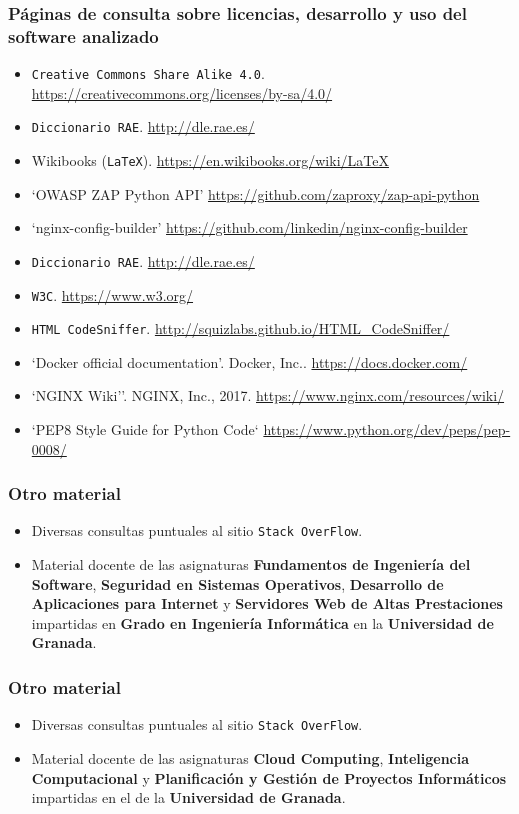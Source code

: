 
\printbibliography[heading=bibempty]

\bigskip
\subsubsection*{Páginas de consulta sobre licencias, desarrollo y uso del software analizado}
\begin{itemize}
	\item {\tt Creative Commons Share Alike 4.0}. \url{https://creativecommons.org/licenses/by-sa/4.0/}
	\item {\tt Diccionario RAE}. \url{http://dle.rae.es/}
	\item Wikibooks ({\tt LaTeX}). \url{https://en.wikibooks.org/wiki/LaTeX}
	\item `OWASP ZAP Python API' \url{https://github.com/zaproxy/zap-api-python}
	\item `nginx-config-builder' \url{https://github.com/linkedin/nginx-config-builder}
	\item {\tt Diccionario RAE}. \url{http://dle.rae.es/}
	\item {\tt W3C}. \url{https://www.w3.org/}
	\item {\tt HTML CodeSniffer}. \url{http://squizlabs.github.io/HTML_CodeSniffer/}
	\item `Docker official documentation'. Docker, Inc.. \url{https://docs.docker.com/}
	\item `NGINX Wiki''. NGINX, Inc., 2017. \url{https://www.nginx.com/resources/wiki/}
	\item `PEP8 Style Guide for Python Code` \url{https://www.python.org/dev/peps/pep-0008/}
\end{itemize}
\bigskip
\subsubsection*{Otro material}
\begin{itemize}
	\item Diversas consultas puntuales al sitio {\tt Stack OverFlow}.
	\item Material docente de las asignaturas \textbf{Fundamentos de Ingeniería del Software}, \textbf{Seguridad en Sistemas Operativos}, \textbf{Desarrollo de Aplicaciones para Internet} y \textbf{Servidores Web de Altas Prestaciones} impartidas en \textbf{Grado en Ingeniería Informática} en la \textbf{Universidad de Granada}.
\end{itemize}

\subsubsection*{Otro material}
\begin{itemize}
	\item Diversas consultas puntuales al sitio {\tt Stack OverFlow}.
	\item Material docente de las asignaturas \textbf{Cloud Computing}, \textbf{Inteligencia Computacional} y \textbf{Planificación y Gestión de Proyectos Informáticos} impartidas en el \master de la \textbf{Universidad de Granada}.
\end{itemize}